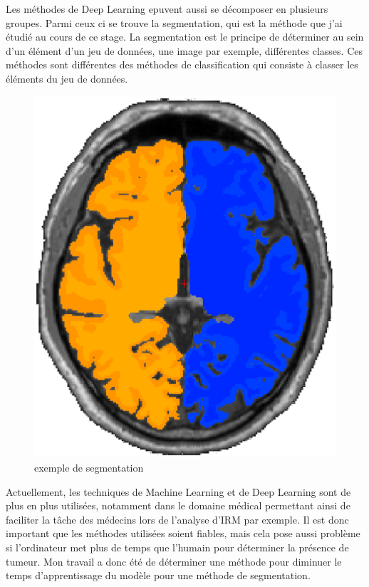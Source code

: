 \documentclass{book}
\newcommand{\p}{\vspace{0.2cm}}
\begin{document}
		Les méthodes de Deep Learning epuvent aussi se décomposer en plusieurs groupes. Parmi ceux ci se trouve la segmentation, qui est la méthode que j'ai étudié au cours de ce stage. La segmentation est le principe de déterminer au sein d'un élément d'un jeu de données, une image par exemple, différentes classes. Ces méthodes sont différentes des méthodes de classification qui consiste à classer les éléments du jeu de données.\clearpage
		\begin{figure}
			\begin{center}
				\includegraphics[scale=0.5]{annex/segmentation}
				\caption{exemple de segmentation}
				\label{segmentation}
			\end{center}
		\end{figure}\p

		Actuellement, les techniques de Machine Learning et de Deep Learning sont de plus en plus utilisées, notamment dans le domaine médical permettant ainsi de faciliter la tâche des médecins lors de l'analyse d'IRM par exemple. Il est donc important que les méthodes utilisées soient fiables, mais cela pose aussi problème si l'ordinateur met plus de temps que l'humain pour déterminer la présence de tumeur. Mon travail a donc été de déterminer une méthode pour diminuer le temps d'apprentissage du modèle pour une méthode de segmentation.\p
\end{document}
